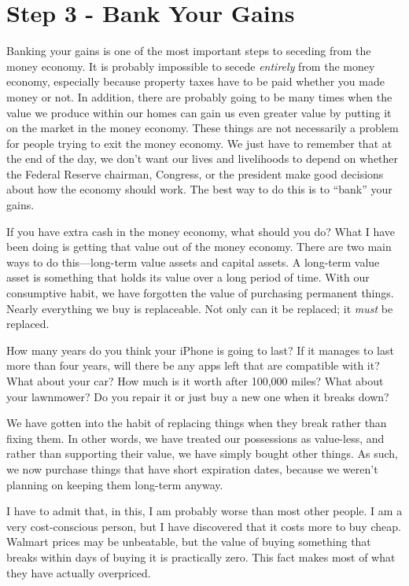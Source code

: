 \documentclass[letterpaper]{article}
\begin{document}
\section{Step 3 - Bank Your Gains}
{\color{black}
\textcolor[rgb]{0.32941177,0.5529412,0.83137256}{Banking your gains }is
one of the most important steps to seceding from the money economy. It
is probably impossible to secede \textit{entirely} from the money
economy, especially because property taxes have to be paid whether you
made money or not. In addition, there are probably going to be many
times when the value we produce within our homes can gain us even
greater value by putting it on the market in the money economy. These
things are not necessarily a problem for people trying to exit the
money economy. We just have to remember that at the end of the day, we
don’t want our lives and livelihoods to depend on whether the Federal
Reserve chairman, Congress, or the president make good decisions about
how the economy should work. The best way to do this is to “bank” your
gains.}

{\color{black}
If you have extra cash in the money economy, what should you do?  What I
have been doing is getting that value out of the money economy. There
are two main ways to do this—long-term value assets and capital assets.
A long-term value asset is something that holds its value over a long
period of time. With our consumptive habit, we have forgotten the value
of purchasing permanent things. Nearly everything we buy is
replaceable. Not only can it be replaced; it \textit{must} be replaced.
}

{\color{black}
How many years do you think your iPhone is going to last? If it manages
to last more than four years, will there be any apps left that are
compatible with it? What about your car? How much is it worth after
100,000 miles? What about your lawnmower? Do you repair it or just buy
a new one when it breaks down?}

{\color{black}
We have gotten into the habit of replacing things when they break rather
than fixing them. In other words, we have treated our possessions as
value-less, and rather than supporting their value, we have simply
bought other things. As such, we now purchase things that have short
expiration dates, because we weren’t planning on keeping them long-term
anyway. }

{\color{black}
I have to admit that, in this, I am probably worse than most other
people. I am a very cost-conscious person, but I have discovered that
it costs more to buy cheap. Walmart prices may be unbeatable, but the
value of buying something that breaks within days of buying it is
practically zero.  This fact makes most of what they have actually
overpriced. }
\end{document}
